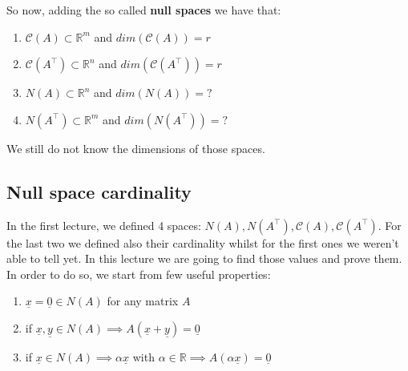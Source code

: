 So now, adding the so called \textbf{null spaces} we have that:
\begin{enumerate}
    \item $\mathcal{C}(A) \subset  \mathbb{R}^m$ and $dim(\mathcal{C}(A)) = r$
    \item $\mathcal{C}(A^\intercal) \subset \mathbb{R}^n$ and $dim(\mathcal{C}(A^\intercal)) = r$
    \item $N(A) \subset \mathbb{R}^n$ and $dim(N(A)) = ?$
    \item $N(A^\intercal) \subset \mathbb{R}^m$ and $dim(N(A^\intercal)) = ?$
\end{enumerate}
We still do not know the dimensions of those spaces. 
\subsection*{Null space cardinality}
In the first lecture, we defined 4 spaces: $N(A), N(A^\intercal), \mathcal{C}(A), \mathcal{C}(A^\intercal)$. For the last two we defined also their cardinality whilst for the first ones we weren't able to tell yet. In this lecture we are going to find those values and prove them. In order to do so, we start from few useful properties:
\begin{enumerate}
    \item $\underline{x} = \underline{0} \in N(A)$ for any matrix $A$
    \item if $\underline{x}, \underline{y} \in N(A) \implies A(\underline{x} + \underline{y}) = \underline{0}$
    \item if $\underline{x} \in N(A) \implies \alpha\underline{x}$ with $\alpha \in \mathbb{R} \implies A(\alpha\underline{x}) = \underline{0}$
\end{enumerate}  

